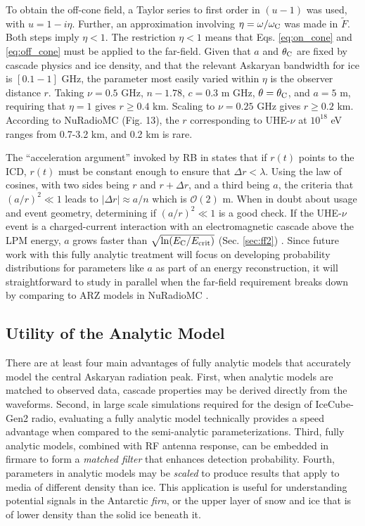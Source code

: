\documentclass[amsmath,amssymb,aps,prd,10pt,twocolumn]{revtex4}
\begin{document}
To obtain the off-cone field, a Taylor series to first order in $(u-1)$ was used, with $u = 1-i\eta$.  Further, an approximation involving $\eta = \omega/\omega_{\rm C}$ was made in $\widetilde{F}$.  Both steps imply $\eta < 1$.  The restriction $\eta < 1$ means that Eqs. \ref{eq:on_cone} and \ref{eq:off_cone} must be applied to the far-field.  Given that $a$ and $\theta_{\rm C}$ are fixed by cascade physics and ice density, and that the relevant Askaryan bandwidth for ice is $[0.1-1]$ GHz, the parameter most easily varied within $\eta$ is the observer distance $r$.  Taking $\nu = 0.5$ GHz, $n - 1.78$, $c = 0.3$ m GHz, $\theta = \theta_{\rm C}$, and $a = 5$ m, requiring that $\eta = 1$ gives $r \geq 0.4$ km.  Scaling to $\nu = 0.25$ GHz gives $r \geq 0.2$ km.  According to NuRadioMC \cite{10.1140/epjc/s10052-020-7612-8} (Fig. 13), the $r$ corresponding to UHE-$\nu$ at $10^{18}$ eV ranges from 0.7-3.2 km, and 0.2 km is rare.

The ``acceleration argument'' invoked by RB in \cite{10.1103/physrevd.65.016003} states that if $r(t)$ points to the ICD, $r(t)$ must be constant enough to ensure that $\Delta r < \lambda$.  Using the law of cosines, with two sides being $r$ and $r+\Delta r$, and a third being $a$, the criteria that $(a/r)^2 \ll 1$ leads to $|\Delta r| \approx a/n$ which is $\mathcal{O}(2)$ m.  When in doubt about usage and event geometry, determining if $(a/r)^2 \ll 1$ is a good check.  If the UHE-$\nu$ event is a charged-current interaction with an electromagnetic cascade above the LPM energy, $a$ grows faster than $\sqrt{\ln(E_{\rm C}/E_{\rm crit})}$ (Sec. \ref{sec:ff2}) \cite{10.1103/physrevd.82.074017}.  Since future work with this fully analytic treatment will focus on developing probability distributions for parameters like $a$ as part of an energy reconstruction, it will straightforward to study in parallel when the far-field requirement breaks down by comparing to ARZ models in NuRadioMC \cite{10.1140/epjc/s10052-020-7612-8}.

\subsection{Utility of the Analytic Model}

There are at least four main advantages of fully analytic models that accurately model the central Askaryan radiation peak.  First, when analytic models are matched to observed data, cascade properties may be derived directly from the waveforms.  Second, in large scale simulations required for the design of IceCube-Gen2 radio, evaluating a fully analytic model technically provides a speed advantage when compared to the semi-analytic parameterizations.  Third, fully analytic models, combined with RF antenna response, can be embedded in firmare to form a \textit{matched filter} that enhances detection probability.  Fourth, parameters in analytic models may be \textit{scaled} to produce results that apply to media of different density than ice.  This application is useful for understanding potential signals in the Antarctic \textit{firn}, or the upper layer of snow and ice that is of lower density than the solid ice beneath it.
\end{document}

